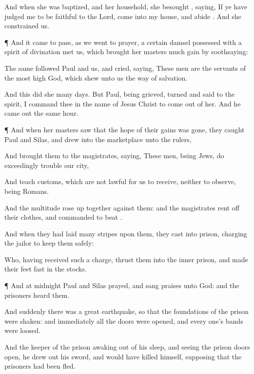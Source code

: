 {And
when she was
baptized,
and
her
household, she
besought
{},
saying,
If ye have
judged
me to
be
faithful to the
Lord,
come
into
my
house, and
abide
{}.
And she
constrained
us.


\par }{\PP {}¶
And it came to
pass, as
we
went
to
prayer, a
certain
damsel
possessed with a
spirit of
divination
met
us,
which
brought
her
masters
much
gain by
soothsaying:

The
same
followed
Paul
and
us, and
cried,
saying,
These
men
are the
servants of the most
high
God,
which shew
unto
us the
way of
salvation.

And
this did
she
many
days.
But
Paul, being
grieved,
turned
and
said to the
spirit, I
command
thee
in the
name of
Jesus
Christ to come
out
of
her.
And he came
out the
same
hour.


\par }{\PP {}¶
And when
her
masters
saw
that the
hope of
their
gains was
gone, they
caught
Paul
and
Silas, and
drew
{}
into the
marketplace
unto the
rulers,

And
brought
them to the
magistrates,
saying,
These
men,
being
Jews, do exceedingly
trouble
our
city,

And
teach
customs,
which
are
not
lawful for
us to
receive,
neither to
observe,
being
Romans.

And the
multitude rose up
together
against
them:
and the
magistrates rent
off
their
clothes, and
commanded to
beat
{}.

And when they had
laid
many
stripes upon
them, they
cast
{}
into
prison,
charging the
jailor to
keep
them
safely:

Who, having
received
such a
charge,
thrust
them
into the
inner
prison,
and
made
their
feet
fast
in the
stocks.


\par }{\PP {}¶
And
at
midnight
Paul
and
Silas
prayed, and sang
praises unto
God:
and the
prisoners
heard
them.

And
suddenly there
was a
great
earthquake, so
that the
foundations of the
prison were
shaken:
and
immediately
all the
doors were
opened,
and every
one’s
bands were
loosed.

And the keeper of the
prison awaking
out of his
sleep,
and
seeing the
prison
doors
open, he drew
out his
sword, and
would have
killed
himself, supposing
that the
prisoners had been
fled.

}
